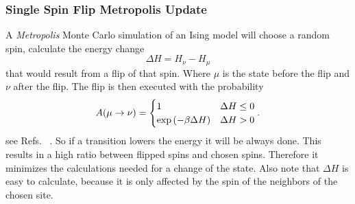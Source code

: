    \subsubsection{Single Spin Flip Metropolis Update}
        A \emph{Metropolis} Monte Carlo \cite{Metropolis1953} simulation of an
        Ising model will choose a random spin, calculate the energy change
        \begin{equation}
            \Delta H = H_\nu - H_\mu
            \label{eq:dH}
        \end{equation}
        that would result from a flip of that spin. Where \(\mu\) is the
        state before the flip and \(\nu\) after the flip. The flip is then executed
        with the probability
        \begin{equation}
            A(\mu \to \nu) =
            \begin{cases}
                1                            & \Delta H \le 0 \\
                \exp{\ensuremath{\left(-\beta \Delta H\right)}} & \Delta H > 0
            \end{cases}.
            \label{eq:metropolis}
        \end{equation}
        see Refs.\ \cite{NewmanBarkema1999} \cite{Katzgraber2011}.
        So if a transition lowers the energy it will be always done. This
        results in a high ratio between flipped spins and chosen spins.
        Therefore it minimizes the calculations needed for a change of
        the state. Also note that \(\Delta H\) is easy to calculate,
        because it is only affected by the spin of the neighbors of the
        chosen site.

